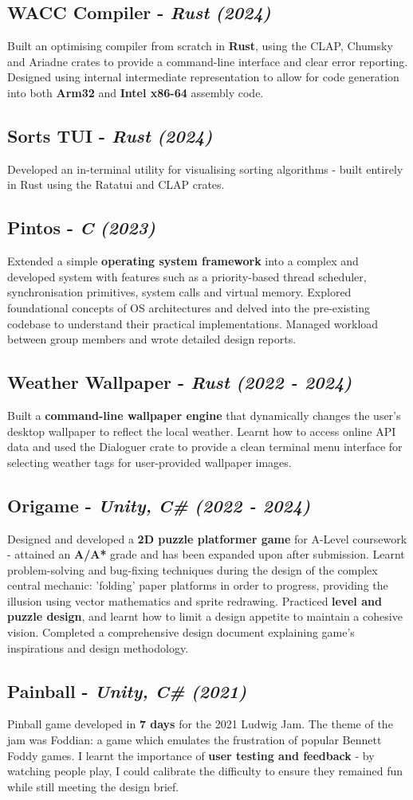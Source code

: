\documentclass{article}
\newcommand{\dates}[1]{\hfill\textit{(#1)}}
\newcommand{\project}[4]{
    \subsection*{\textbf{#1} - \textit{#3} \dates{#2}}\hfill
    \begin{minipage}{\dimexpr\textwidth - 1em}
        #4
    \end{minipage}
}
\begin{document}
\project{WACC Compiler }{2024}{Rust}{
    Built an optimising compiler from scratch in \textbf{Rust}, using the CLAP, Chumsky and Ariadne crates to provide a command-line interface
    and clear error reporting. Designed using internal intermediate representation to allow for code generation into both
    \textbf{Arm32} and \textbf{Intel x86-64} assembly code.
}

\project{Sorts TUI}{2024}{Rust}{
    Developed an in-terminal utility for visualising sorting algorithms - built entirely in Rust using the Ratatui and CLAP crates.
}

\project{Pintos }{2023}{C}{
    Extended a simple \textbf{operating system framework} into a complex and developed system with features such as a priority-based thread scheduler, 
    synchronisation primitives, system calls and virtual memory. Explored foundational concepts of OS architectures and delved into the
    pre-existing codebase to understand their practical implementations. Managed workload between group members and wrote detailed design reports. 
}

\project{Weather Wallpaper}{2022 - 2024}{Rust}{
    Built a \textbf{command-line wallpaper engine} that dynamically changes the user's desktop wallpaper to reflect the local weather. 
    Learnt how to access online API data and used the Dialoguer crate to provide a clean terminal menu interface for selecting weather tags for 
    user-provided wallpaper images.
}

\project{Origame}{2022 - 2024}{Unity, C\#}{
    Designed and developed a \textbf{2D puzzle platformer game} for A-Level coursework - attained an \textbf{A/A*} grade
    and has been expanded upon after submission. Learnt problem-solving and bug-fixing techniques during the design of the complex central mechanic: 
    'folding' paper platforms in order to progress, providing the illusion using vector mathematics and sprite redrawing.
    Practiced \textbf{level and puzzle design}, and learnt how to limit a design appetite to maintain a cohesive vision.  
    Completed a comprehensive design document explaining game's inspirations and design methodology.
}

\project{Painball}{2021}{Unity, C\#}{
    Pinball game developed in \textbf{7 days} for the 2021 Ludwig Jam. The theme of the jam was Foddian: a game
    which emulates the frustration of popular Bennett Foddy games.
    I learnt the importance of \textbf{user testing and feedback} - by watching people play, I could calibrate the difficulty
    to ensure they remained fun while still meeting the design brief. 
}
    
\end{document}
